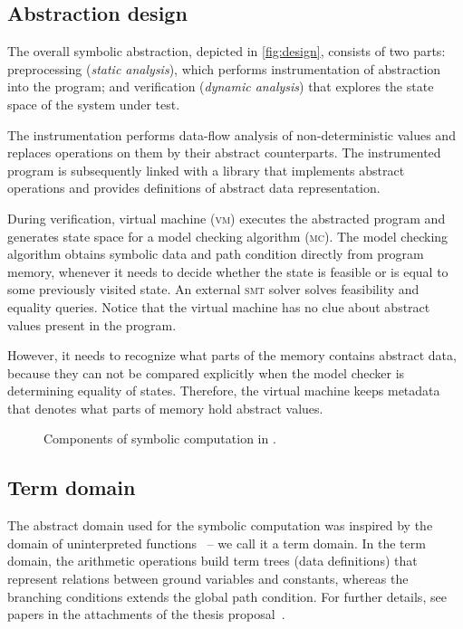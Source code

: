 \subsection{Abstraction design}

The overall symbolic abstraction, depicted in \autoref{fig:design}, consists of
two parts: preprocessing (\emph{static analysis}), which performs
instrumentation of abstraction into the program; and verification
(\emph{dynamic analysis}) that explores the state space of the system under
test.

The instrumentation performs data-flow analysis of non-de\-ter\-ministic values and
replaces operations on them by their abstract counterparts. The instrumented
program is subsequently linked with a library that implements abstract
operations and provides definitions of abstract data representation.

During verification, virtual machine (\textsc{vm}) executes the abs\-trac\-ted
program and generates state space for a model checking algorithm (\textsc{mc}).
The model checking algorithm obtains symbolic data and path condition directly
from program memory, whenever it needs to decide whether the state is feasible
or is equal to some previously visited state. An external \textsc{smt} solver solves
feasibility and equality queries. Notice that the virtual machine has no clue
about abstract values present in the program.

However, it needs to recognize what parts of the memory contains abstract data,
because they can not be compared explicitly when the model checker is
determining equality of states. Therefore, the virtual machine keeps metadata
that denotes what parts of memory hold abstract values.

\begin{figure}
    \centering
    
    \caption{Components of symbolic computation in \divine.}
    \label{fig:design}
\end{figure}

\subsection{Term domain}

The abstract domain used for the symbolic computation was inspired by the
domain of uninterpreted functions~\cite{Gange2016} -- we call it a term domain.
In the term domain, the arithmetic operations build term trees (data
definitions) that represent relations between ground variables and constants,
whereas the branching conditions extends the global path condition.  For
further details, see papers in the attachments of the thesis
proposal~\cite{Lauko2018SymComp, Lauko2019Sym}.

